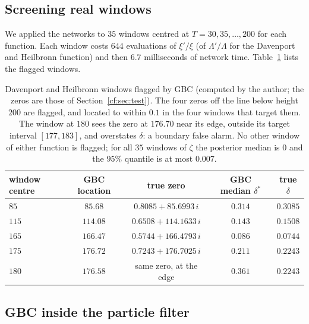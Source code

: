 \subsection{Screening real windows}

We applied the networks to $35$ windows centred at $T=30,35,\dots,200$ for each function. Each window costs $644$ evaluations of $\xi'/\xi$ (of $\Lambda'/\Lambda$ for the Davenport and Heilbronn function) and then $6.7$ milliseconds of network time. Table~\ref{cf:tab:scan} lists the flagged windows.

\begin{table}[h]
\centering
\small\setlength{\tabcolsep}{4pt}\begin{tabular}{lcccc}
\toprule
window centre & GBC location & true zero & GBC median $\delta^\ast$ & true $\delta$\\
\midrule
$85$ & $85.68$ & $0.8085+85.6993\,i$ & $0.314$ & $0.3085$\\
$115$ & $114.08$ & $0.6508+114.1633\,i$ & $0.143$ & $0.1508$\\
$165$ & $166.47$ & $0.5744+166.4793\,i$ & $0.086$ & $0.0744$\\
$175$ & $176.72$ & $0.7243+176.7025\,i$ & $0.211$ & $0.2243$\\
$180$ & $176.58$ & same zero, at the edge & $0.361$ & $0.2243$\\
\bottomrule
\end{tabular}
\caption{Davenport and Heilbronn windows flagged by GBC (computed by the author; the zeros are those of Section~\ref{cf:sec:test}). The four zeros off the line below height $200$ are flagged, and located to within $0.1$ in the four windows that target them. The window at $180$ sees the zero at $176.70$ near its edge, outside its target interval $[177,183]$, and overstates $\delta$: a boundary false alarm. No other window of either function is flagged; for all $35$ windows of $\zeta$ the posterior median is $0$ and the $95\%$ quantile is at most $0.007$.}
\label{cf:tab:scan}
\end{table}

\subsection{GBC inside the particle filter}\label{cf:sec:gbcpf}

